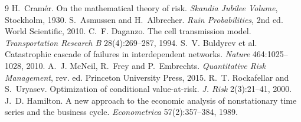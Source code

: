 \documentclass[10pt,twocolumn,a4paper]{article}
\begin{document}
\balance
\begin{thebibliography}{9}\small
\setlength{\itemsep}{0pt}\setlength{\parsep}{0pt}
 H.~Cram\'er. On the mathematical theory of risk. \emph{Skandia Jubilee Volume}, Stockholm, 1930.
 S.~Asmussen and H.~Albrecher. \emph{Ruin Probabilities}, 2nd ed. World Scientific, 2010.
 C.~F. Daganzo. The cell transmission model. \emph{Transportation Research B} 28(4):269--287, 1994.
 S.~V. Buldyrev et al. Catastrophic cascade of failures in interdependent networks. \emph{Nature} 464:1025--1028, 2010.
 A.~J. McNeil, R.~Frey and P.~Embrechts. \emph{Quantitative Risk Management}, rev. ed. Princeton University Press, 2015.
 R.~T. Rockafellar and S.~Uryasev. Optimization of conditional value-at-risk. \emph{J. Risk} 2(3):21--41, 2000.
 J.~D. Hamilton. A new approach to the economic analysis of nonstationary time series and the business cycle. \emph{Econometrica} 57(2):357--384, 1989.
\end{thebibliography}
\end{document}
